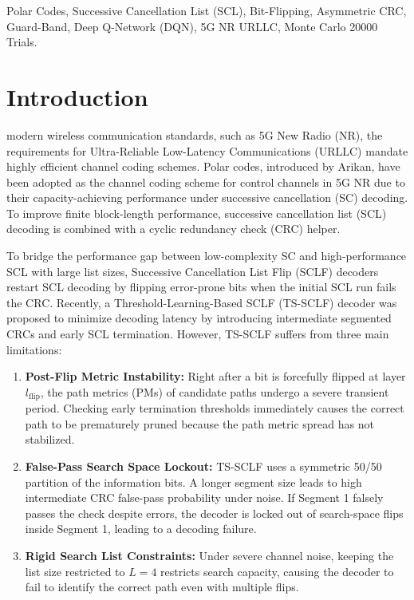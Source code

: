 \documentclass[journal,10pt,twocolumn]{IEEEtran}
\begin{document}
\begin{IEEEkeywords}
Polar Codes, Successive Cancellation List (SCL), Bit-Flipping, Asymmetric CRC, Guard-Band, Deep Q-Network (DQN), 5G NR URLLC, Monte Carlo 20000 Trials.
\end{IEEEkeywords}

\section{Introduction}
 modern wireless communication standards, such as 5G New Radio (NR), the requirements for Ultra-Reliable Low-Latency Communications (URLLC) mandate highly efficient channel coding schemes. Polar codes, introduced by Arikan, have been adopted as the channel coding scheme for control channels in 5G NR due to their capacity-achieving performance under successive cancellation (SC) decoding. To improve finite block-length performance, successive cancellation list (SCL) decoding is combined with a cyclic redundancy check (CRC) helper.

To bridge the performance gap between low-complexity SC and high-performance SCL with large list sizes, Successive Cancellation List Flip (SCLF) decoders restart SCL decoding by flipping error-prone bits when the initial SCL run fails the CRC. Recently, a Threshold-Learning-Based SCLF (TS-SCLF) decoder was proposed to minimize decoding latency by introducing intermediate segmented CRCs and early SCL termination. However, TS-SCLF suffers from three main limitations:
\begin{enumerate}
    \item \textbf{Post-Flip Metric Instability:} Right after a bit is forcefully flipped at layer $l_{\text{flip}}$, the path metrics (PMs) of candidate paths undergo a severe transient period. Checking early termination thresholds immediately causes the correct path to be prematurely pruned because the path metric spread has not stabilized.
    \item \textbf{False-Pass Search Space Lockout:} TS-SCLF uses a symmetric 50/50 partition of the information bits. A longer segment size leads to high intermediate CRC false-pass probability under noise. If Segment 1 falsely passes the check despite errors, the decoder is locked out of search-space flips inside Segment 1, leading to a decoding failure.
    \item \textbf{Rigid Search List Constraints:} Under severe channel noise, keeping the list size restricted to $L = 4$ restricts search capacity, causing the decoder to fail to identify the correct path even with multiple flips.
\end{enumerate}
\end{document}
